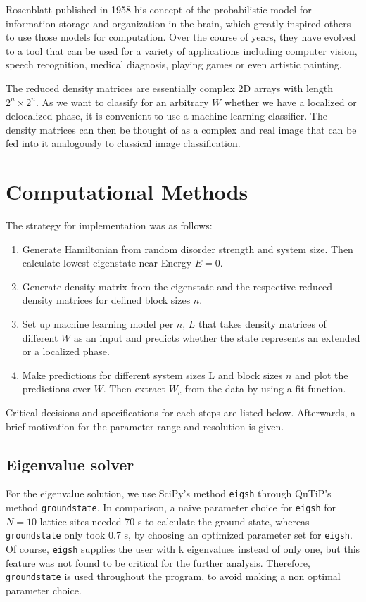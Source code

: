 \documentclass[reprint,amsmath,amssymb,aps,prb]{revtex4-2}
\begin{document}
Rosenblatt published in 1958 his concept of the probabilistic model for information storage and organization in the brain, which greatly inspired others to use those models for computation.\cite{Rosenblatt1958} Over the course of years, they have evolved to a tool that can be used for a variety of applications including computer vision, speech recognition, medical diagnosis, playing games or even artistic painting.\cite{Gatys2015}

The reduced density matrices are essentially complex 2D arrays with length $2^n\times2^n$. As we want to classify for an arbitrary $W$ whether we have a localized or delocalized phase, it is convenient to use a machine learning classifier. The density matrices can then be thought of as a complex and real image that can be fed into it analogously to classical image classification.


\section{Computational Methods}

The strategy for implementation was as follows:

\begin{enumerate}
	\item Generate Hamiltonian from random disorder strength and system size. Then calculate lowest eigenstate near Energy $E = 0$.
	\item Generate density matrix from the eigenstate and the respective reduced density matrices for defined block sizes $n$.
	\item  Set up machine learning model per $n$, $L$ that takes density matrices of different $W$ as an input and predicts whether the state represents an extended or a localized phase.
	\item Make predictions for different system sizes L and block sizes $n$ and plot the predictions over $W$. Then extract $W_c$	from the data by using a fit function.
\end{enumerate}

Critical decisions and specifications for each steps are listed below. Afterwards, a brief motivation for the parameter range and resolution is given.

\subsection{Eigenvalue solver}

For the eigenvalue solution, we use SciPy's method \texttt{eigsh} through QuTiP's method \texttt{groundstate}\cite{Virtanen_2020, Johansson2012}. In comparison, a naive parameter choice for \texttt{eigsh} for $N=10$ lattice sites needed 70 s to calculate the ground state, whereas \texttt{groundstate} only took 0.7 s, by choosing an optimized parameter set for \texttt{eigsh}. Of course, \texttt{eigsh} supplies the user with k eigenvalues instead of only one, but this feature was not found to be critical for the further analysis. Therefore, \texttt{groundstate} is used throughout the program, to avoid making a non optimal parameter choice.
\end{document}
